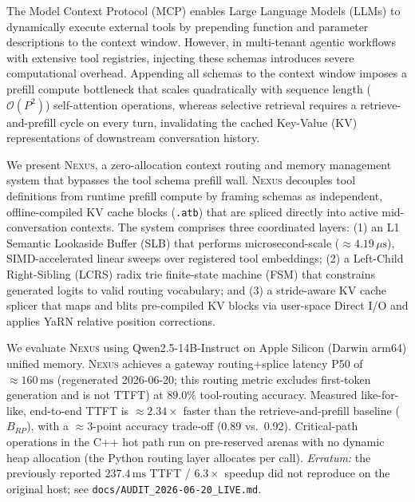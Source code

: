 The Model Context Protocol (MCP) enables Large Language Models (LLMs) to dynamically execute external tools by prepending function and parameter descriptions to the context window. However, in multi-tenant agentic workflows with extensive tool registries, injecting these schemas introduces severe computational overhead. Ap\-pend\-ing all schemas to the context window imposes a prefill compute bottleneck that scales quadratically with sequence length ($\mathcal{O}(P^2)$) self-attention operations, whereas selective retrieval requires a retrieve-and-prefill cycle on every turn, invalidating the cached Key-Value (KV) representations of downstream conversation history.

We present \textsc{Nexus}, a zero-allocation context routing and memory management system that bypasses the tool schema prefill wall. \textsc{Nexus} decouples tool definitions from runtime prefill compute by framing schemas as independent, offline-compiled KV cache blocks (\texttt{.atb}) that are spliced directly into active mid-conversation contexts. The system comprises three coordinated layers: (1) an L1 Semantic Lookaside Buffer (SLB) that performs microsecond-scale ($\approx 4.19\,\mu\text{s}$), SIMD-accelerated linear sweeps over registered tool embeddings; (2) a Left-Child Right-Sibling (LCRS) radix trie finite-state machine (FSM) that constrains generated logits to valid routing vocabulary; and (3) a stride-aware KV cache splicer that maps and blits pre-compiled KV blocks via user-space Direct I/O and applies YaRN relative position corrections.

We evaluate \textsc{Nexus} using Qwen2.5-14B-Instruct on Apple Silicon (Darwin arm64) unified memory. \textsc{Nexus} achieves a gateway routing+splice latency P50 of $\approx 160\,\text{ms}$ (regenerated 2026-06-20; this routing metric excludes first-token generation and is not TTFT) at $89.0\%$ tool-routing accuracy. Measured like-for-like, end-to-end TTFT is $\approx 2.34\times$ faster than the retrieve-and-prefill baseline ($B_{RP}$), with a $\approx 3$-point accuracy trade-off (0.89 vs.\ 0.92). Critical-path operations in the C++ hot path run on pre-reserved arenas with no dynamic heap allocation (the Python routing layer allocates per call). \emph{Erratum:} the previously reported $237.4\,\text{ms}$ TTFT / $6.3\times$ speedup did not reproduce on the original host; see \texttt{docs/AUDIT\_2026-06-20\_LIVE.md}.
